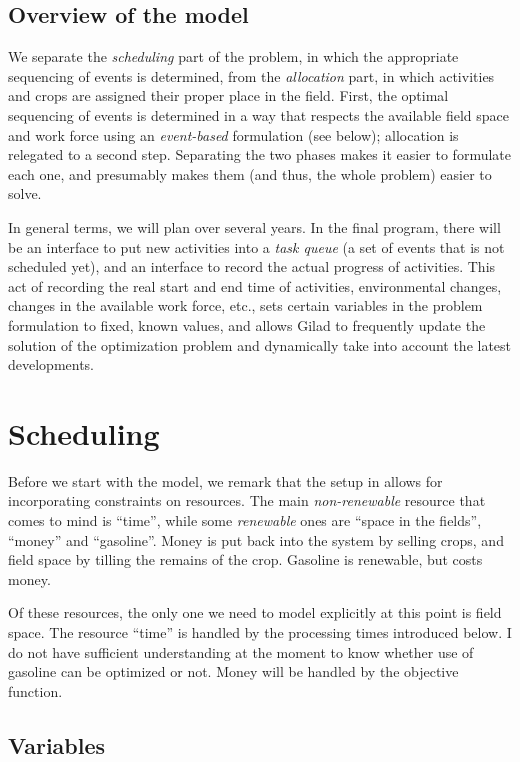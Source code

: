 \documentclass[11pt,reqno]{amsart}
\numberwithin{equation}{section}
\begin{document}
\subsection{Overview of the model}


We separate the \emph{scheduling} part of the problem, in which the
appropriate sequencing of events is determined, from the
\emph{allocation} part, in which activities and crops are assigned
their proper place in the field. First, the optimal sequencing of
events is determined in a way that respects the available field space
and work force using an \emph{event-based} formulation (see below);
allocation is relegated to a second step. Separating the two phases
makes it easier to formulate each one, and presumably makes them (and
thus, the whole problem) easier to solve.

In general terms, we will plan over several years. In the final
program, there will be an interface to put new activities into a
\emph{task queue} (a set of events that is not scheduled yet), and an
interface to record the actual progress of activities. This act of
recording the real start and end time of activities, environmental
changes, changes in the available work force, etc., sets certain
variables in the problem formulation to fixed, known values, and
allows Gilad to frequently update the solution of the optimization
problem and dynamically take into account the latest developments.

\section{Scheduling}

Before we start with the model, we remark that the setup in \cite{artigues-etal11} allows
for incorporating constraints on resources. The main \emph{non-renewable} resource that
comes to mind is ``time'', while some  \emph{renewable} ones are ``space in the
fields'', ``money'' and ``gasoline''. Money is put back into the system by selling 
crops, and field space by tilling the remains of the crop. Gasoline is renewable, but
costs money.

Of these resources, the only one we need to model explicitly at this point is field
space. The resource ``time'' is handled by the processing times introduced below. I do not
have sufficient understanding at the moment to know whether use of gasoline can be
optimized or not. Money will be handled by the objective function.

\subsection{Variables}
\end{document}
